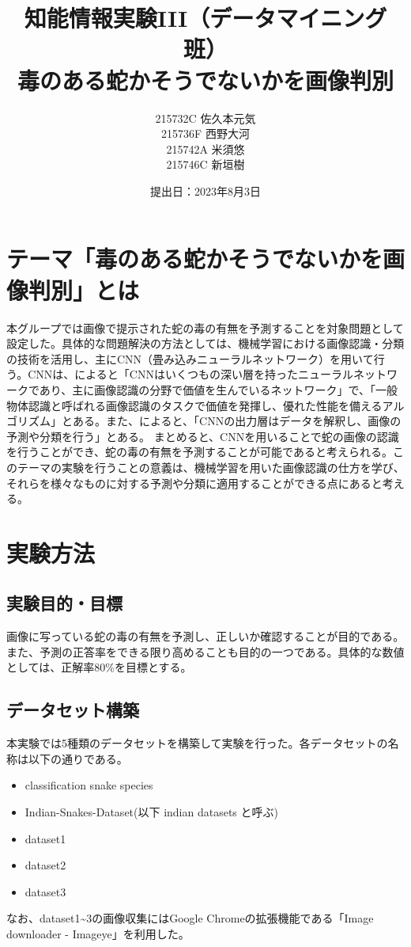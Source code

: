 \documentclass[a4paper, 11pt, titlepage]{jsarticle}
\title{知能情報実験III（データマイニング班）\\毒のある蛇かそうでないかを画像判別}
\author{215732C 佐久本元気\\215736F 西野大河\\215742A 米須悠\\215746C 新垣樹\\}
\date{提出日：2023年8月3日}
\begin{document}
\maketitle
\tableofcontents
\clearpage

\section{テーマ「毒のある蛇かそうでないかを画像判別」とは}
本グループでは画像で提示された蛇の毒の有無を予測することを対象問題として設定した。具体的な問題解決の方法としては、機械学習における画像認識・分類の技術を活用し、主にCNN（畳み込みニューラルネットワーク）を用いて行う。CNNは、\cite{theme1}によると「CNNはいくつもの深い層を持ったニューラルネットワークであり、主に画像認識の分野で価値を生んでいるネットワーク」で、「一般物体認識と呼ばれる画像認識のタスクで価値を発揮し、優れた性能を備えるアルゴリズム」とある。また、\cite{theme2}によると、「CNNの出力層はデータを解釈し、画像の予測や分類を行う」とある。
まとめると、CNNを用いることで蛇の画像の認識を行うことができ、蛇の毒の有無を予測することが可能であると考えられる。このテーマの実験を行うことの意義は、機械学習を用いた画像認識の仕方を学び、それらを様々なものに対する予測や分類に適用することができる点にあると考える。

\section{実験方法}
\subsection{実験目的・目標}
画像に写っている蛇の毒の有無を予測し、正しいか確認することが目的である。また、予測の正答率をできる限り高めることも目的の一つである。具体的な数値としては、正解率80\%を目標とする。

\subsection{データセット構築}
本実験では5種類のデータセットを構築して実験を行った。各データセットの名称は以下の通りである。\par
\begin{itemize}
\item classification snake species
\item Indian-Snakes-Dataset(以下 indian datasets と呼ぶ)
\item dataset1
\item dataset2
\item dataset3
\end{itemize}\par
なお、dataset1\textasciitilde3の画像収集にはGoogle Chromeの拡張機能である「Image downloader - Imageye」を利用した。\par
\end{document}
